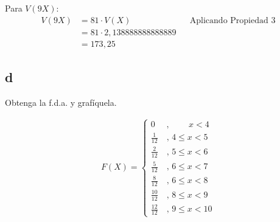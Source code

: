 \documentclass{templateNote}
\begin{document}
Para $V(9X)$:
\begin{align*}
    V(9X) &= 81 \cdot V(X) && \text{Aplicando Propiedad 3} \\
    &= 81 \cdot 2,138888888888889 \\
    &= 173,25
\end{align*}

\subsection{d}
Obtenga la f.d.a. y grafíquela.

\begin{align*}
    F(X) =
    \displaystyle \begin{cases}
        0 \quad \text{ , } \quad \quad x < 4\\
        \frac{1}{12} \quad \text{, }4 \leq x < 5 \\
        \frac{2}{12} \quad \text{, }5 \leq x < 6 \\
        \frac{5}{12} \quad \text{, }6 \leq x < 7 \\
        \frac{8}{12} \quad \text{, }6 \leq x < 8 \\
        \frac{10}{12} \quad \text{, }8 \leq x < 9 \\
        \frac{12}{12} \quad \text{, }9 \leq x < 10
    \end{cases}
\end{align*}
\end{document}
